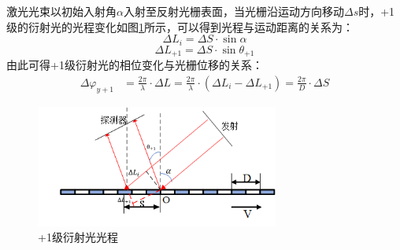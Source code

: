 \documentclass[type=master,oneside]{fduthesis}
\begin{document}
激光光束以初始入射角$\alpha $入射至反射光栅表面，当光栅沿运动方向移动$\Delta s$时，+1级的衍射光的光程变化如图\ref{fig:+1级衍射光光程}所示，可以得到光程与运动距离的关系为：
\begin{equation}
  \Delta L_{i}=\Delta S \cdot \sin \alpha
\end{equation}
\begin{equation}
  \Delta L_{+1}=\Delta S \cdot \sin \theta_{+1}
\end{equation}
由此可得+1级衍射光的相位变化与光栅位移的关系：
\begin{equation}
  \begin{aligned}
    \Delta \varphi_{y+1} & =\frac{2 \pi}{\lambda} \cdot \Delta L =\frac{2 \pi}{\lambda} \cdot\left(\Delta L_{i}-\Delta L_{+1}\right) =\frac{2 \pi}{D} \cdot \Delta S
  \end{aligned}
\end{equation}
\begin{figure}[H]
  \centering
  \includegraphics[width=8cm]{2-fig/+1级光程差.png}
  \caption{+1级衍射光光程}
  \label{fig:+1级衍射光光程}
\end{figure}
\end{document}
